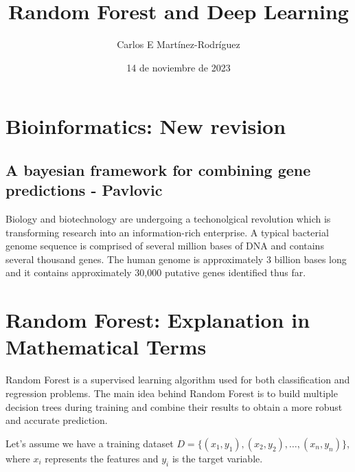 \documentclass{article}
\title{Random Forest and Deep Learning}
\author{Carlos E Mart\'inez-Rodr\'iguez}
\date{14  de noviembre de 2023}  %
\begin{document}
\maketitle
\tableofcontents

\newpage
\section{Bioinformatics: New revision}

\subsection{A bayesian framework for combining gene predictions - Pavlovic}

Biology and biotechnology are undergoing a techonolgical revolution which is transforming research into an information-rich enterprise.  A typical bacterial genome sequence is comprised of several million bases of DNA and contains several thousand genes. The human genome is approximately 3 billion bases long and it contains approximately 30,000 putative genes identified thus far.



\section{Random Forest: Explanation in Mathematical Terms}

Random Forest is a supervised learning algorithm used for both classification and regression problems. The main idea behind Random Forest is to build multiple decision trees during training and combine their results to obtain a more robust and accurate prediction.

Let's assume we have a training dataset \(D = \{(x_1, y_1), (x_2, y_2), \ldots, (x_n, y_n)\}\), where \(x_i\) represents the features and \(y_i\) is the target variable.
\end{document}
